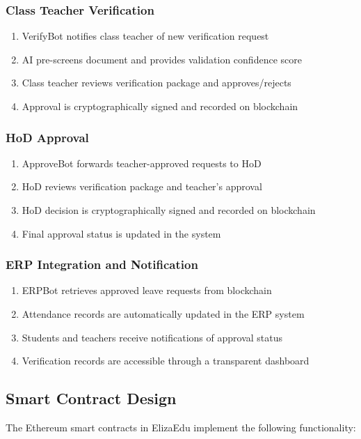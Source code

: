 \documentclass[a4paper,12pt]{article}
\begin{document}
\subsubsection{Class Teacher Verification}
\begin{enumerate}
    \item VerifyBot notifies class teacher of new verification request
    \item AI pre-screens document and provides validation confidence score
    \item Class teacher reviews verification package and approves/rejects
    \item Approval is cryptographically signed and recorded on blockchain
\end{enumerate}

\subsubsection{HoD Approval}
\begin{enumerate}
    \item ApproveBot forwards teacher-approved requests to HoD
    \item HoD reviews verification package and teacher's approval
    \item HoD decision is cryptographically signed and recorded on blockchain
    \item Final approval status is updated in the system
\end{enumerate}

\subsubsection{ERP Integration and Notification}
\begin{enumerate}
    \item ERPBot retrieves approved leave requests from blockchain
    \item Attendance records are automatically updated in the ERP system
    \item Students and teachers receive notifications of approval status
    \item Verification records are accessible through a transparent dashboard
\end{enumerate}

\subsection{Smart Contract Design}
The Ethereum smart contracts in ElizaEdu implement the following functionality:
\end{document}
